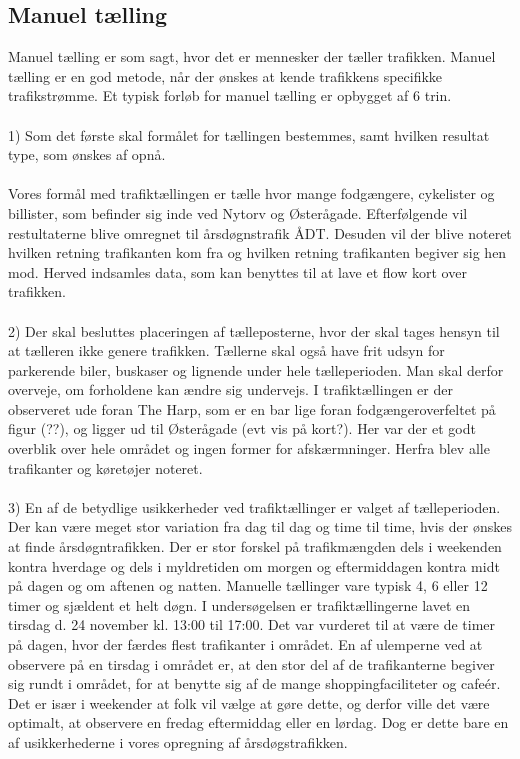 \subsection{Manuel tælling}
\label{sub:manuel_taelling}
Manuel tælling er som sagt, hvor det er mennesker der tæller trafikken. Manuel tælling er en god metode, når der ønskes at kende trafikkens specifikke trafikstrømme. Et typisk forløb for manuel tælling er opbygget af 6 trin.
\\\\
1) Som det første skal formålet for tællingen bestemmes, samt hvilken resultat type, som ønskes af opnå.
\\\\
Vores formål med trafiktællingen er tælle hvor mange fodgængere, cykelister og billister, som befinder sig inde ved Nytorv og Østerågade. Efterfølgende vil restultaterne blive omregnet  til årsdøgnstrafik ÅDT. Desuden vil der blive noteret hvilken retning trafikanten kom fra og hvilken retning trafikanten begiver sig hen mod. Herved indsamles data, som kan benyttes til at lave et flow kort over trafikken.
\\\\
2) Der skal besluttes placeringen af tælleposterne, hvor der skal tages hensyn til at tælleren ikke genere trafikken. Tællerne skal også have frit udsyn for parkerende biler, buskaser og lignende under hele tælleperioden. Man skal derfor overveje, om forholdene kan ændre sig undervejs. I trafiktællingen er der observeret ude foran The Harp, som er en bar lige foran fodgængeroverfeltet på figur (??), og ligger ud til Østerågade (evt vis på kort?). Her var der et godt overblik over hele området og ingen former for afskærmninger. Herfra blev alle trafikanter og køretøjer noteret.
\\\\
3) En af de betydlige usikkerheder ved trafiktællinger er valget af tælleperioden. Der kan være meget stor variation fra dag til dag og time til time, hvis der ønskes at finde årsdøgntrafikken. Der er stor forskel på trafikmængden dels i weekenden kontra hverdage og dels i myldretiden om morgen og eftermiddagen kontra midt på dagen og om aftenen og natten. Manuelle tællinger vare typisk 4, 6 eller 12 timer og sjældent et helt døgn. I undersøgelsen er trafiktællingerne lavet en tirsdag d. 24 november kl. 13:00 til 17:00. Det var vurderet til at være de timer på dagen, hvor der færdes flest trafikanter i området. En af ulemperne ved at observere på en tirsdag i området er, at den stor del af de trafikanterne begiver sig rundt i området, for at benytte sig af de mange shoppingfaciliteter og cafeér. Det er især i weekender at folk vil vælge at gøre dette, og derfor ville det være optimalt, at observere en fredag eftermiddag eller en lørdag. Dog er dette bare en af usikkerhederne i vores opregning af årsdøgstrafikken.

